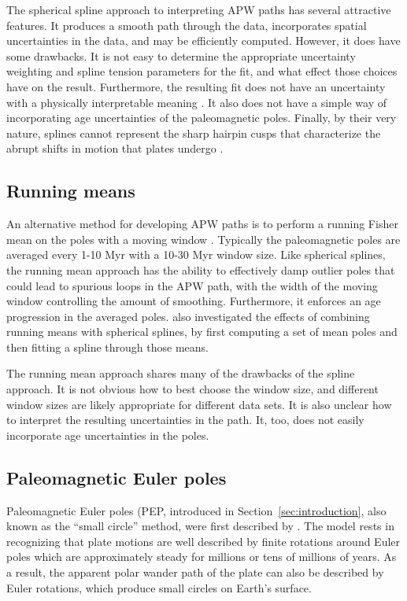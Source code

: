 \documentclass[preprint,12pt,authoryear]{elsarticle}
\begin{document}
The spherical spline approach to interpreting APW paths has several attractive features.
It produces a smooth path through the data, incorporates spatial uncertainties
in the data, and may be efficiently computed.
However, it does have some drawbacks.
It is not easy to determine the appropriate uncertainty weighting and spline
tension parameters for the fit, and what effect those choices have on the result.
Furthermore, the resulting fit does not have an uncertainty with a physically
interpretable meaning \citep{torsvik1996continental}.
It also does not have a simple way of incorporating age uncertainties of the paleomagnetic poles.
Finally, by their very nature, splines cannot represent the sharp hairpin cusps
that characterize the abrupt shifts in motion that plates undergo \citep{irving1972hairpins, gordon1984paleomagnetic}.

\subsection{Running means}
\label{sec:running_means}
An alternative method for developing APW paths is to perform a running Fisher
mean on the poles with a moving window \citep{van2001evidence, torsvik2008global}.
Typically the paleomagnetic poles are averaged every 1-10 Myr with a 10-30 Myr
window size. Like spherical splines, the running mean approach has the ability
to effectively damp outlier poles that could lead to spurious loops in the APW path, with the width
of the moving window controlling the amount of smoothing.
Furthermore, it enforces an age progression in the averaged poles.
\citet{torsvik2008global} also investigated the effects of combining running means
with spherical splines, by first computing a set of mean poles and then
fitting a spline through those means.

The running mean approach shares many of the drawbacks of the spline approach. 
It is not obvious how to best choose the window size, and different window sizes are
likely appropriate for different data sets. 
It is also unclear how to interpret the resulting uncertainties in the path.
It, too, does not easily incorporate age uncertainties in the poles.

\subsection{Paleomagnetic Euler poles}
Paleomagnetic Euler poles (PEP, introduced in Section~\ref{sec:introduction}, 
also known as the ``small circle'' method, were first described by \citet{gordon1984paleomagnetic}.
The model rests in recognizing that plate motions are well described by finite
rotations around Euler poles which are approximately steady for millions or 
tens of millions of years. As a result, the apparent polar wander path of the plate
can also be described by Euler rotations, which
produce small circles on Earth's surface.
\end{document}
